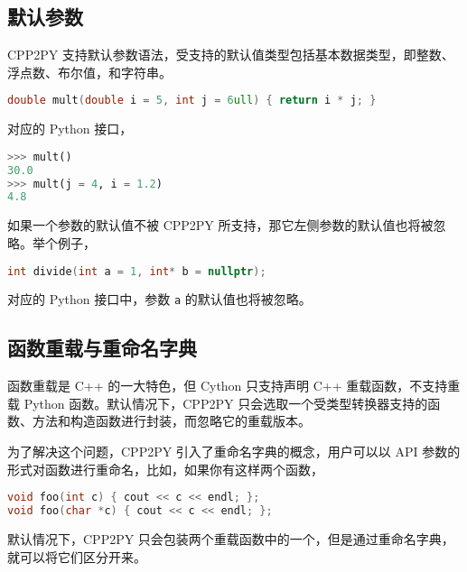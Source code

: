 \subsection{默认参数}

CPP2PY 支持默认参数语法，受支持的默认值类型包括基本数据类型，即整数、浮点数、布尔值，和字符串。

\begin{framed}
\begin{lstlisting}[language=c++]
double mult(double i = 5, int j = 6ull) { return i * j; }
\end{lstlisting}
\end{framed}对应的 Python 接口，\begin{framed}
\begin{lstlisting}[language=python]
>>> mult()
30.0
>>> mult(j = 4, i = 1.2)
4.8
\end{lstlisting}
\end{framed}

如果一个参数的默认值不被 CPP2PY 所支持，那它左侧参数的默认值也将被忽略。举个例子，

\begin{framed}
\begin{lstlisting}[language=c++]
int divide(int a = 1, int* b = nullptr);
\end{lstlisting}
\end{framed}对应的 Python 接口中，参数 \lstinline{a} 的默认值也将被忽略。

\subsection{函数重载与重命名字典}

函数重载是 C++ 的一大特色，但 Cython 只支持声明 C++ 重载函数，不支持重载 Python 函数。默认情况下，CPP2PY 只会选取一个受类型转换器支持的函数、方法和构造函数进行封装，而忽略它的重载版本。

为了解决这个问题，CPP2PY 引入了重命名字典的概念，用户可以以 API 参数的形式对函数进行重命名，比如，如果你有这样两个函数，

\begin{framed}
\begin{lstlisting}[language=c++]
void foo(int c) { cout << c << endl; };
void foo(char *c) { cout << c << endl; };
\end{lstlisting}
\end{framed}

默认情况下，CPP2PY 只会包装两个重载函数中的一个，但是通过重命名字典，就可以将它们区分开来。

